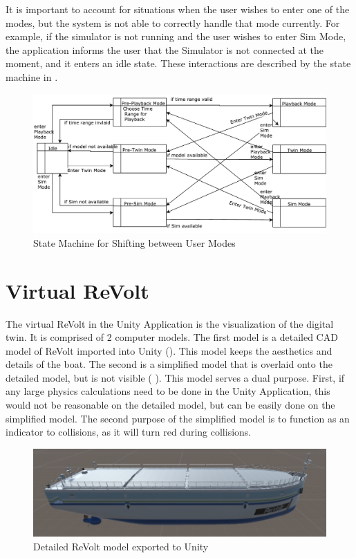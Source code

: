 It is important to account for situations when the user wishes to enter one of the modes, but the system is not able to correctly handle that mode currently. For example, if the simulator is not running and the user wishes to enter Sim Mode, the application informs the user that the Simulator is not connected at the moment, and it enters an idle state. These interactions are described by the state machine in .

\begin{figure}[H]
\centering
\includegraphics[scale=0.5]{Images/StateMachine.pdf}
\caption{State Machine for Shifting between User Modes}
\label{fig:modeStateMachine}
\end{figure}


\section{Virtual ReVolt}

The virtual ReVolt in the Unity Application is the visualization of the digital twin. It is comprised of 2 computer models. The first model is a detailed CAD model of ReVolt imported into Unity (). This model keeps the aesthetics and details of the boat. The second is a simplified model that is overlaid onto the detailed model, but is not visible ( ). This model serves a dual purpose. First, if any large physics calculations need to be done in the Unity Application, this would not be reasonable on the detailed model, but can be easily done on the simplified model. The second purpose of the simplified model is to function as an indicator to collisions, as it will turn red during collisions.

\begin{figure}[H]
\centering
\includegraphics[scale=0.5]{Images/DetailedModel.png}
\caption{Detailed ReVolt model exported to Unity}
\label{fig:detailedReVoltModel}
\end{figure}

